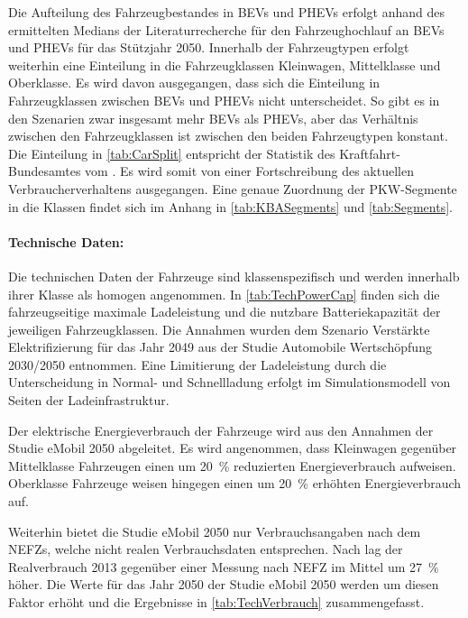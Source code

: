 Die Aufteilung des Fahrzeugbestandes in \glspl{BEV} und \glspl{PHEV} erfolgt anhand des ermittelten Medians der Literaturrecherche für den Fahrzeughochlauf an \glspl{BEV} und \glspl{PHEV} für das Stützjahr \num{2050}.
Innerhalb der Fahrzeugtypen erfolgt weiterhin eine Einteilung in die Fahrzeugklassen Kleinwagen, Mittelklasse und Oberklasse.
Es wird davon ausgegangen, dass sich die Einteilung in Fahrzeugklassen zwischen \glspl{BEV} und \glspl{PHEV} nicht unterscheidet.
So gibt es in den Szenarien zwar insgesamt mehr \glspl{BEV} als \glspl{PHEV}, aber das Verhältnis zwischen den Fahrzeugklassen ist zwischen den beiden Fahrzeugtypen konstant.
Die Einteilung in \autoref{tab:CarSplit} entspricht der Statistik des Kraftfahrt-Bundesamtes \cite{KBASegments2020} vom .
Es wird somit von einer Fortschreibung des aktuellen Verbraucherverhaltens ausgegangen.
Eine genaue Zuordnung der \gls{PKW}-Segmente in die Klassen findet sich im Anhang in \autoref{tab:KBASegments} und \autoref{tab:Segments}.




\paragraph{Technische Daten:}

Die technischen Daten der Fahrzeuge sind klassenspezifisch und werden innerhalb ihrer Klasse als homogen angenommen.
In \autoref{tab:TechPowerCap} finden sich die fahrzeugseitige maximale Ladeleistung und die nutzbare Batteriekapazität der jeweiligen Fahrzeugklassen.
Die Annahmen wurden dem Szenario \glqq Verstärkte Elektrifizierung\grqq{} für das Jahr \num{2049} aus der Studie Automobile Wertschöpfung \num{2030}/\num{2050} \cite{Kaul2019} entnommen.
Eine Limitierung der Ladeleistung durch die Unterscheidung in Normal- und Schnellladung erfolgt im Simulationsmodell von Seiten der Ladeinfrastruktur.



Der elektrische Energieverbrauch der Fahrzeuge wird aus den Annahmen der Studie \glqq eMobil \num{2050}\grqq{} \cite{Hacker2014} abgeleitet.
Es wird angenommen, dass Kleinwagen gegenüber Mittelklasse Fahrzeugen einen um \SI{20}{\percent} reduzierten Energieverbrauch aufweisen.
Oberklasse Fahrzeuge weisen hingegen einen um \SI{20}{\percent} erhöhten Energieverbrauch auf.\medskip

Weiterhin bietet die Studie \glqq eMobil \num{2050}\grqq{} nur Verbrauchsangaben nach dem \glspl{NEFZ}, welche nicht realen Verbrauchsdaten entsprechen.
Nach \cite{Heinfellner2015} lag der Realverbrauch \num{2013} gegenüber einer Messung nach \gls{NEFZ} im Mittel um \SI{27}{\percent} höher.
Die Werte für das Jahr \num{2050} der Studie \glqq eMobil \num{2050}\grqq{} werden um diesen Faktor erhöht und die Ergebnisse in \autoref{tab:TechVerbrauch} zusammengefasst.

